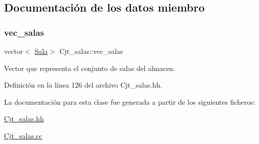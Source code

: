 \subsection{Documentación de los datos miembro}
\mbox{\label{class_cjt__salas_a3f130cc8bab35f449de8be69283af09e}} 
\subsubsection{\texorpdfstring{vec\+\_\+salas}{vec\_salas}}
{\footnotesize\ttfamily vector$<$ \hyperlink{class_sala}{Sala}$>$ Cjt\+\_\+salas\+::vec\+\_\+salas\hspace{0.3cm}{\ttfamily [private]}}



Vector que representa el conjunto de salas del almacen. 



Definición en la línea 126 del archivo Cjt\+\_\+salas.\+hh.



La documentación para esta clase fue generada a partir de los siguientes ficheros\+:\begin{DoxyCompactItemize}
\item 
\hyperlink{_cjt__salas_8hh}{Cjt\+\_\+salas.\+hh}\item 
\hyperlink{_cjt__salas_8cc}{Cjt\+\_\+salas.\+cc}\end{DoxyCompactItemize}
